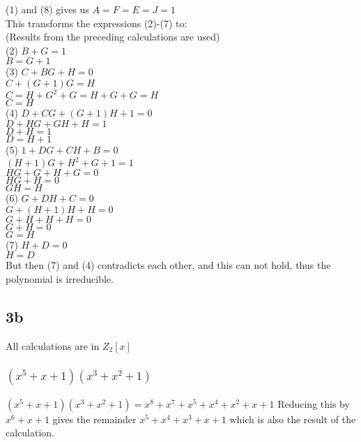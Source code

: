 \documentclass[a4paper,11pt]{article}
\begin{document}
				(1) and (8) gives us $A = F = E = J = 1$\\

				This transforms the expressions (2)-(7) to:\\
				(Results from the preceding calculations are used)\\

				(2)	$B + G = 1$\\
						$B = G + 1$\\
				(3)	$C + BG + H = 0$\\
						$C + (G+1)G = H $\\
						$C = H + G^2 + G = H + G+G = H$\\
						$C = H$\\
				(4)	$D + CG + (G+1)H + 1 = 0$\\
						$D + HG + GH+H = 1$\\
						$D + H = 1$\\
						$D = H + 1$\\
				(5)	$1 + DG + CH + B = 0$\\
						$(H + 1)G + H^2 + G + 1 = 1$\\
						$HG + G + H + G = 0$\\
						$HG + H = 0$\\
						$GH = H$\\
				(6)	$G + DH + C = 0$\\
						$G + (H+1)H + H = 0$\\
						$G + H + H + H = 0$\\
						$G + H = 0$\\
						$G = H$\\
				(7)	$H + D = 0$\\
						$H = D$\\

				But then (7) and (4) contradicts each other, and this can not hold, thus the
				polynomial is irreducible.

		\subsection*{3b}
			All calculations are in $Z_2[x]$\\
			\subsubsection{$(x^5+x+1)(x^3+x^2+1)$}
				$(x^5+x+1)(x^3+x^2+1) = x^8 + x^7 + x^5 + x^4 + x^2 + x + 1$
				Reducing this by $x^6 + x + 1$ gives the remainder $x^5 + x^4 + x^3 + x + 1$ which is also the result of the calculation.

				\subsubsection{ }

			
\end{document}

